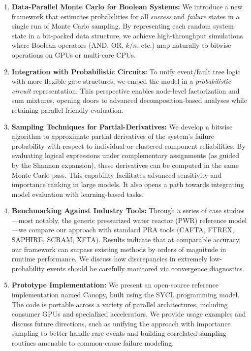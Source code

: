 \begin{enumerate}
\item \textbf{Data-Parallel Monte Carlo for Boolean Systems:}  
We introduce a new framework that estimates probabilities for all \emph{success} and \emph{failure} states in a single run of Monte Carlo sampling. By representing each random system state in a bit-packed data structure, we achieve high-throughput simulations where Boolean operators (AND, OR, \(k/n\), etc.) map naturally to bitwise operations on GPUs or multi-core CPUs.

\item \textbf{Integration with Probabilistic Circuits:}  
To unify event/fault tree logic with more flexible gate structures, we embed the model in a \emph{probabilistic circuit} representation. This perspective enables node-level factorization and sum mixtures, opening doors to advanced decomposition-based analyses while retaining parallel-friendly evaluation.

\item \textbf{Sampling Techniques for Partial-Derivatives:}  
We develop a bitwise algorithm to approximate partial derivatives of the system’s failure probability with respect to individual or clustered component reliabilities. By evaluating logical expressions under complementary assignments (as guided by the Shannon expansion), these derivatives can be computed in the same Monte Carlo pass. This capability facilitates advanced sensitivity and importance ranking in large models. It also opens a path towards integrating model evaluation with learning-based tasks.

\item \textbf{Benchmarking Against Industry Tools:}  
Through a series of case studies—most notably, the generic pressurized water reactor (PWR) reference model—we compare our approach with standard PRA tools (CAFTA, FTREX, SAPHIRE, SCRAM, XFTA). Results indicate that at comparable accuracy, our framework can surpass existing methods by orders of magnitude in runtime performance. We discuss how discrepancies in extremely low-probability events should be carefully monitored via convergence diagnostics.

\item \textbf{Prototype Implementation:}  
We present an open-source reference implementation named Canopy, built using the SYCL programming model. The code is portable across a variety of parallel architectures, including consumer GPUs and specialized accelerators. We provide usage examples and discuss future directions, such as unifying the approach with importance sampling to better handle rare events and building correlated sampling routines amenable to common-cause failure modeling.
\end{enumerate}

